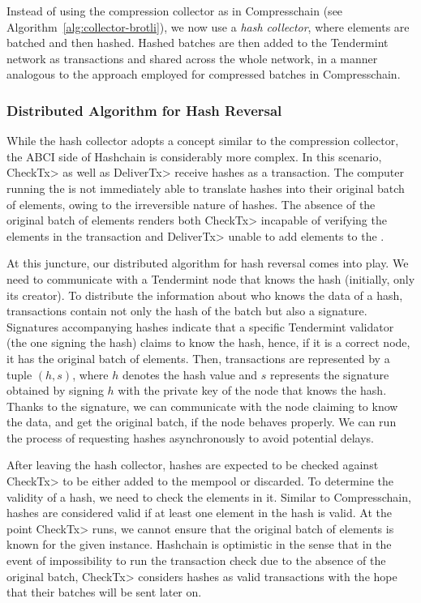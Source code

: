 Instead of using the compression collector as in Compresschain (see
Algorithm~\ref{alg:collector-brotli}), we now use a \emph{hash
collector}, where elements are batched and then hashed. 
%
Hashed batches are then added to the Tendermint network as transactions and
shared across the whole network, in a manner analogous to the approach employed
for compressed batches in Compresschain.

\subsubsection{Distributed Algorithm for Hash Reversal}

While the hash collector adopts a concept similar to the compression collector,
the ABCI side of Hashchain is considerably more complex.
%
In this scenario, \<CheckTx> as well as \<DeliverTx> receive hashes as a transaction.
%
The computer running the \setchain is not immediately able to translate
hashes into their original batch of elements, owing to the irreversible
nature of hashes.
%
The absence of the original batch of elements renders both \<CheckTx> incapable
of verifying the elements in the transaction and \<DeliverTx> unable to
add elements to the \setchain.
%

At this juncture, our distributed algorithm for hash reversal comes into play.
%
We need to communicate with a Tendermint node that knows the hash
(initially, only its creator).
%
To distribute the information about who knows the data of a hash, transactions
contain not only the hash of the batch but also a signature.
%
Signatures accompanying hashes indicate that a specific Tendermint
validator (the one signing the hash) claims to know the hash, hence,
if it is a correct node, it has the original batch of elements.
%
Then, transactions are represented by a tuple $(h, s)$, where $h$ denotes
the hash value and $s$ represents the signature obtained by signing $h$ with
the private key of the node that knows the hash.
%
Thanks to the signature, we can communicate with the node claiming to know the
data, and get the original batch, if the node behaves properly.
%
We can run the process of requesting hashes asynchronously to avoid potential
delays.

%

After leaving the hash collector, hashes are expected to be checked against
\<CheckTx> to be either added to the mempool or discarded.
%
To determine the validity of a hash, we need to check the elements in it.
%
Similar to Compresschain, hashes are considered valid if at least one element
in the hash is valid.
%
At the point \<CheckTx> runs, we cannot ensure that the original batch of
elements is known for the given instance.
%
Hashchain is optimistic in the sense that in the event of impossibility
to run the transaction check due to the absence of the original batch,
\<CheckTx> considers hashes as valid transactions with the hope that
their batches will be sent later on.

